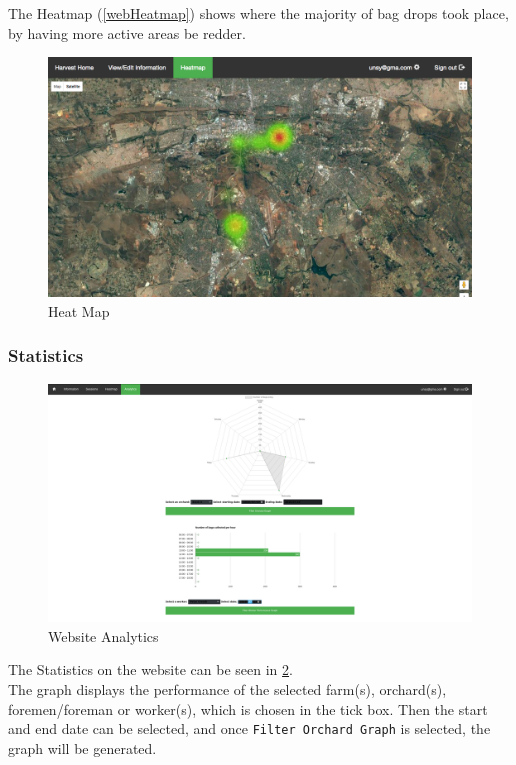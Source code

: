 \documentclass[11pt]{article}
\begin{document}
The Heatmap (\ref{webHeatmap}) shows where the majority of bag drops took place, by having more active areas be redder.

\begin{figure}
 \centering
 \includegraphics[width=12cm, keepaspectratio]{Images/webHeatMap.png}
 \caption{Heat Map}
 \label{HeatMap}
\end{figure}

\subsubsection{Statistics}
\label{webAnalytics}

\begin{figure}
 \centering
 \includegraphics[width=12cm, keepaspectratio]{Images/webAnal.png}
 \caption{Website Analytics}
 \label{webAnalImg}
\end{figure}

The Statistics on the website can be seen in \ref{webAnalImg}. \\
The graph displays the performance of the selected farm(s), orchard(s), foremen/foreman or worker(s), which is chosen in the tick box. Then the start and end date can be selected, and once \texttt{Filter Orchard Graph} is selected, the graph will be generated.\\
\end{document}
